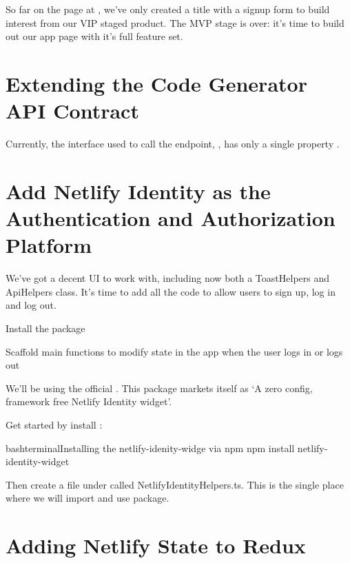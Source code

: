 \documentclass[paper=6in:9in,pagesize=pdftex,headinclude=on,footinclude=on,12pt,twoside]{scrbook}
\begin{document}
So far on the page at , we've only created a title with a signup form to build interest from our VIP staged product. The MVP stage is over: it's time to build out our app page with it's full feature set.

\section{Extending the Code Generator API Contract}

Currently, the interface used to call the  endpoint, , has only a single property .

\section{Add Netlify Identity as the Authentication and Authorization Platform}

We've got a decent UI to work with, including now both a ToastHelpers and ApiHelpers class. It's time to add all the code to allow users to sign up, log in and log out. 

\begin{arrows}
\item Install the  package
\item Scaffold main functions to modify state in the app when the user logs in or logs out
\end{arrows}


We'll be using the official . This package markets itself as `A zero config, framework free Netlify Identity widget'. 


Get started by install :

\begin{codeInput}{bash}{terminal}{Installing the netlify-idenity-widge via npm}
npm install netlify-identity-widget
\end{codeInput}

Then create a file under  called NetlifyIdentityHelpers.ts. This is the single place where we will import and use  package.

\section{Adding Netlify State to Redux}
\end{document}
